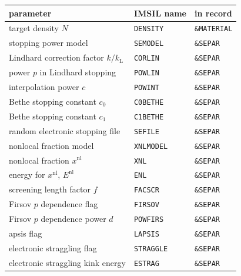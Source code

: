 \begin{center}
\begin{tabular}{lll}
   parameter \quad                         & IMSIL name     & in record \\
   \hline
   target density $N$                      & {\tt DENSITY}  & {\tt \&MATERIAL} \\
   stopping power model                    & {\tt SEMODEL}  & {\tt \&SEPAR} \\
   Lindhard correction factor $k/k_\mathrm{L}$ & {\tt CORLIN} & {\tt \&SEPAR} \\
   power $p$ in Lindhard stopping          & {\tt POWLIN}   & {\tt \&SEPAR} \\
   interpolation power $c$                 & {\tt POWINT}   & {\tt \&SEPAR} \\
   Bethe stopping constant $c_0$           & {\tt C0BETHE}  & {\tt \&SEPAR} \\
   Bethe stopping constant $c_1$           & {\tt C1BETHE}  & {\tt \&SEPAR} \\
   random electronic stopping file         & {\tt SEFILE}   & {\tt \&SEPAR} \\
   nonlocal fraction model                 & {\tt XNLMODEL} & {\tt \&SEPAR} \\
   nonlocal fraction $x^\mathrm{nl}$       & {\tt XNL}      & {\tt \&SEPAR} \\
   energy for $x^\mathrm{nl}$, $E^\mathrm{nl}$ & {\tt ENL}  & {\tt \&SEPAR} \\
   screening length factor $f$             & {\tt FACSCR}   & {\tt \&SEPAR} \\
   Firsov $p$ dependence flag              & {\tt FIRSOV}   & {\tt \&SEPAR} \\
   Firsov $p$ dependence power $d$         & {\tt POWFIRS}  & {\tt \&SEPAR} \\
   apsis flag                              & {\tt LAPSIS}   & {\tt \&SEPAR} \\
   electronic straggling flag              & {\tt STRAGGLE} & {\tt \&SEPAR} \\
   electronic straggling kink energy       & {\tt ESTRAG}   & {\tt \&SEPAR} \\
\end{tabular}
\end{center}
